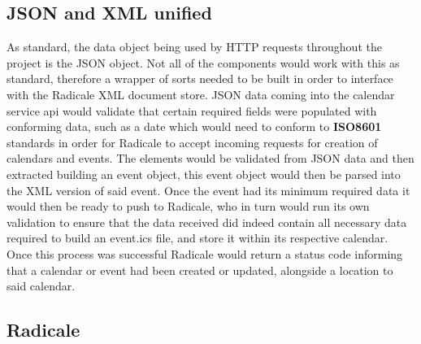 \subsection{JSON and XML unified}
	As standard, the data object being used by HTTP requests throughout the project is the JSON object. Not all of the components would work with this as standard, therefore a wrapper of sorts needed to be built in order to interface with the Radicale XML document store. JSON data coming into the calendar service api would validate that certain required fields were populated with conforming data, such as a date which would need to conform to \textbf{ISO8601} standards in order for Radicale to accept incoming requests for creation of calendars and events. The elements would be validated from JSON data and then extracted building an event object, this event object would then be parsed into the XML version of said event. Once the event had its minimum required data it would then be ready to push to Radicale, who in turn would run its own validation to ensure that the data received did indeed contain all necessary data required to build an event.ics file, and store it within its respective calendar. Once this process was successful Radicale would return a status code informing that a calendar or event had been created or updated, alongside a location to said calendar. 
    
\subsection{Radicale}

